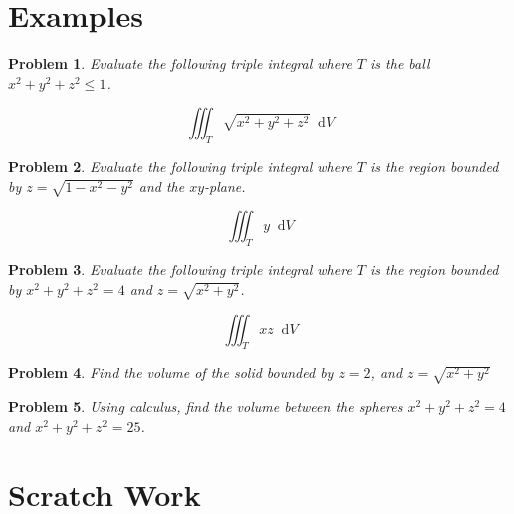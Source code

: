 \documentclass[11pt]{article}
\newtheorem{problem}{Problem}
\newcommand*\dif{\mathop{}\!\mathrm{d}}
\begin{document}
\section{Examples}

\begin{problem}
    Evaluate the following triple integral where $T$ is the ball $x^2+y^2+z^2 \leq 1$.

    \begin{equation*}
        \iiint_T \sqrt{x^2+y^2+z^2}\dif{V}
    \end{equation*}
\end{problem}

\newpage


\begin{problem}
    Evaluate the following triple integral where $T$ is the region bounded by $z=\sqrt{1-x^2 -y^2}$ and the $xy$-plane.

    \begin{equation*}
        \iiint_T y\dif{V}
    \end{equation*}
\end{problem}

\vspace{9cm}



\begin{problem}
    Evaluate the following triple integral where $T$ is the region bounded by $x^2 +y^2+z^2 = 4$ and  $z= \sqrt{x^2+y^2}$.

    \begin{equation*}
        \iiint_T xz\dif{V}
    \end{equation*}
\end{problem}

\newpage 


\begin{problem}
    Find the volume of the solid bounded by $z=2$, and $z=\sqrt{x^2+y^2}$
\end{problem}


\vspace{9cm} 

\begin{problem}
    Using calculus, find the volume between the spheres $x^2+y^2+z^2=4$ and $x^2+y^2 + z^2 = 25$.
\end{problem}


\newpage

\section{Scratch Work}
\end{document}
